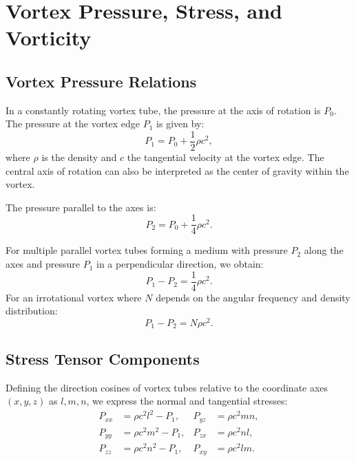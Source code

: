 \documentclass[a4paper,10pt]{article}
\begin{document}
    

    \section{Vortex Pressure, Stress, and Vorticity}

    \subsection*{Vortex Pressure Relations}
    In a constantly rotating vortex tube, the pressure at the axis of rotation is $P_0$. The pressure at the vortex edge $P_1$ is given by:
    \begin{equation*}
        P_1 = P_0 + \frac{1}{2} \rho c^2,
    \end{equation*}
    where $\rho$ is the density and $c$ the tangential velocity at the vortex edge. The central axis of rotation can also be interpreted as the center of gravity within the vortex.

    The pressure parallel to the axes is:
    \begin{equation*}
        P_2 = P_0 + \frac{1}{4} \rho c^2.
    \end{equation*}

    For multiple parallel vortex tubes forming a medium with pressure $P_2$ along the axes and pressure $P_1$ in a perpendicular direction, we obtain:
    \begin{equation*}
        P_1 - P_2 = \frac{1}{4} \rho c^2.
    \end{equation*}
    For an irrotational vortex where $N$ depends on the angular frequency and density distribution:
    \begin{equation*}
        P_1 - P_2 = N \rho c^2.
    \end{equation*}

    \subsection*{Stress Tensor Components}
    Defining the direction cosines of vortex tubes relative to the coordinate axes $(x, y, z)$ as $l, m, n$, we express the normal and tangential stresses:
    \begin{align}
        P_{xx} &= \rho c^2 l^2 - P_1, & P_{yz} &= \rho c^2 m n, \\
        P_{yy} &= \rho c^2 m^2 - P_1, & P_{zx} &= \rho c^2 n l, \\
        P_{zz} &= \rho c^2 n^2 - P_1, & P_{xy} &= \rho c^2 l m.
    \end{align}
\end{document}
